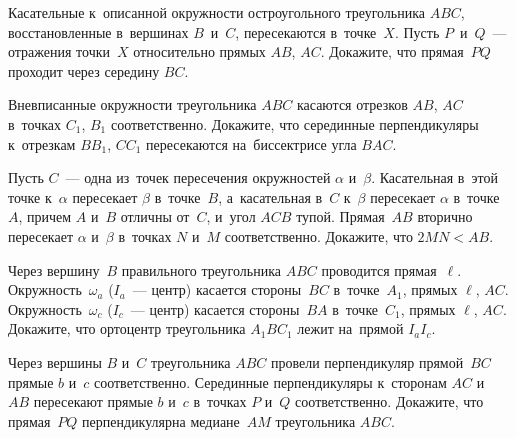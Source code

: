 


\begin{problems}

\item
Касательные к~описанной окружности остроугольного треугольника $ABC$,
восстановленные в~вершинах $B$~и~$C$, пересекаются в~точке~$X$.
Пусть $P$~и~$Q$~--- отражения точки~$X$ относительно прямых $AB$, $AC$.
Докажите, что прямая~$PQ$ проходит через середину $BC$.

\item
Вневписанные окружности треугольника $ABC$ касаются отрезков $AB$, $AC$
в~точках $C_1$, $B_1$ соответственно.
Докажите, что серединные перпендикуляры к~отрезкам $BB_{1}$, $CC_{1}$
пересекаются на~биссектрисе угла $BAC$.

\item
Пусть $C$~--- одна из~точек пересечения окружностей $\alpha$ и~$\beta$.
Касательная в~этой точке к~$\alpha$ пересекает $\beta$ в~точке~$B$,
а~касательная в~$C$ к~$\beta$ пересекает $\alpha$ в~точке~$A$, причем $A$ и~$B$
отличны от~$C$, и~угол $ACB$ тупой.
Прямая~$AB$ вторично пересекает $\alpha$ и~$\beta$ в~точках $N$ и~$M$
соответственно.
Докажите, что $2 MN < AB$.

\item
Через вершину~$B$ правильного треугольника $ABC$ проводится прямая~$\ell$.
Окружность~$\omega_{a}$ ($I_{a}$~--- центр) касается стороны~$BC$
в~точке~$A_1$, прямых $\ell$, $AC$.
Окружность~$\omega_{c}$ ($I_{c}$~--- центр) касается стороны~$BA$
в~точке~$C_1$, прямых $\ell$, $AC$.
Докажите, что ортоцентр треугольника $A_{1}BC_{1}$ лежит на~прямой
$I_{a}I_{c}$.


\item
Через вершины $B$ и~$C$ треугольника $ABC$ провели перпендикуляр прямой~$BC$
прямые $b$ и~$c$ соответственно.
Серединные перпендикуляры к~сторонам $AC$ и~$AB$ пересекают прямые $b$ и~$c$
в~точках $P$ и~$Q$ соответственно.
Докажите, что прямая~$PQ$ перпендикулярна медиане~$AM$ треугольника $ABC$.


\end{problems}
